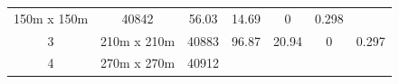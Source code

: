 \documentclass[twoside,12pt,final]{ucthesis-CA2012}
\begin{document}
\begin{ucmainmatter}
\begin{longtable}[]{@{}ccccccc@{}}
\begin{minipage}[t]{0.17\columnwidth}
150m x 150m\strut
\end{minipage} & \begin{minipage}[t]{0.09\columnwidth}\centering\strut
40842\strut
\end{minipage} & \begin{minipage}[t]{0.11\columnwidth}\centering\strut
56.03\strut
\end{minipage} & \begin{minipage}[t]{0.11\columnwidth}\centering\strut
14.69\strut
\end{minipage} & \begin{minipage}[t]{0.16\columnwidth}\centering\strut
0\strut
\end{minipage} & \begin{minipage}[t]{0.11\columnwidth}\centering\strut
0.298\strut
\end{minipage}\tabularnewline
\begin{minipage}[t]{0.06\columnwidth}\centering\strut
3\strut
\end{minipage} & \begin{minipage}[t]{0.17\columnwidth}\centering\strut
210m x 210m\strut
\end{minipage} & \begin{minipage}[t]{0.09\columnwidth}\centering\strut
40883\strut
\end{minipage} & \begin{minipage}[t]{0.11\columnwidth}\centering\strut
96.87\strut
\end{minipage} & \begin{minipage}[t]{0.11\columnwidth}\centering\strut
20.94\strut
\end{minipage} & \begin{minipage}[t]{0.16\columnwidth}\centering\strut
0\strut
\end{minipage} & \begin{minipage}[t]{0.11\columnwidth}\centering\strut
0.297\strut
\end{minipage}\tabularnewline
\begin{minipage}[t]{0.06\columnwidth}\centering\strut
4\strut
\end{minipage} & \begin{minipage}[t]{0.17\columnwidth}\centering\strut
270m x 270m\strut
\end{minipage} & \begin{minipage}[t]{0.09\columnwidth}\centering\strut
40912\strut
\end{minipage} & \begin{minipage}[t]{0.11\columnwidth}\centering\strut

\end{minipage}
\end{longtable}
\end{ucmainmatter}
\end{document}
